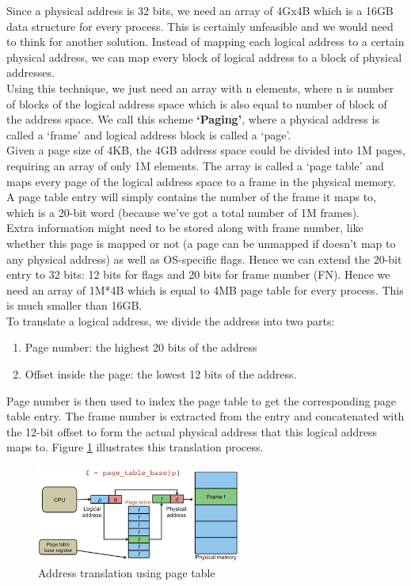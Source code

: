 \documentclass[oneside]{book}
\begin{document}
Since a physical address is 32 bits, we need an array of 4Gx4B which
is a 16GB data structure for every process. This is certainly
unfeasible and we would need to think for another solution.
Instead of mapping each logical address to a certain physical address,
we can map every block of logical address to a block of physical addresses.\\

Using this technique, we just need an array with n elements, where
n is number of blocks of the logical address space which is also
equal to number of block of the address space. We call this scheme
\textbf{`Paging'}, where a physical address is called a `frame'
and logical address block is called a `page'. \\

Given a page size of 4KB, the 4GB address space could be divided
into 1M pages, requiring an array of only 1M elements. The array
is called a `page table' and maps every page of the logical address
space to a frame in the physical memory. A page table entry
will simply contains the number of the frame it maps to, which
is a 20-bit word (because we've got a total number of 1M frames). \\

Extra information might need to be stored along with frame number,
like whether this page is mapped or not (a page can be unmapped
if doesn't map to any physical address) as well as OS-specific flags.
Hence we can extend the 20-bit entry to 32 bits: 12 bits for flags
and 20 bits for frame number (FN). Hence we need an array of 1M*4B
which is equal to 4MB page table for every process. This is much
smaller than 16GB. \\

To translate a logical address, we divide the address into two parts:
\begin{enumerate}
\item Page number: the highest 20 bits of the address
\item Offset inside the page: the lowest 12 bits of the address.
\end{enumerate}
Page number is then used to index the page table to get the
corresponding page table entry. The frame number is extracted
from the entry and concatenated with the 12-bit offset to form
the actual physical address that this logical address maps to.
Figure \ref{pagetable1} illustrates this translation process.

\begin{figure}[H]
\begin{center}
\includegraphics[width=0.6\textwidth]{pagetable1.png}
\end{center}
\caption{Address translation using page table}
\label{pagetable1}
\end{figure}
\end{document}
